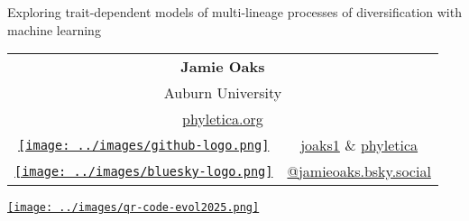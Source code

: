 \begin{frame}[t]
    \begin{columns}[c]

        \begin{minipage}[c][\headlessframetextheight][c]{\columnwidth}
        \begin{center}

            \begin{displaybox}[0.88\linewidth]
            \begin{center}
                \begin{minipage}[c][0.22\textheight][c]{0.88\linewidth}
                \begin{center}
                    \large Exploring trait-dependent models of multi-lineage
                    processes of diversification with machine learning
                \end{center}
                \end{minipage}
            \end{center}
            \end{displaybox}

            \vspace{2.5ex}
            \setlength{\tabcolsep}{0.15em}
            \begin{tabular}{@{}cc@{}}
                \multicolumn{2}{c}{\large\bf Jamie Oaks} \\
                \multicolumn{2}{c}{Auburn University} \\ %
                \multicolumn{2}{c}{\href{https://phyletica.org}{phyletica.org}} \\
                \href{https://github.com/joaks1}{\texttt{[image: ../images/github-logo.png]}}
                & \href{https://github.com/joaks1}{joaks1} \& \href{https://github.com/phyletica}{phyletica} \\
                \href{https://bsky.app/profile/jamieoaks.bsky.social}{\texttt{[image: ../images/bluesky-logo.png]}}
                & \href{https://bsky.app/profile/jamieoaks.bsky.social}{{@}jamieoaks.bsky.social} \\
            \end{tabular}

            \vspace{-1.0ex}
            \begin{center}
                \href{https://phyletica.org/slides/evol2025.pdf}{%
                \texttt{[image: ../images/qr-code-evol2025.png]}}
            \end{center}


\end{center}
\end{minipage}
\end{columns}
\end{frame}
